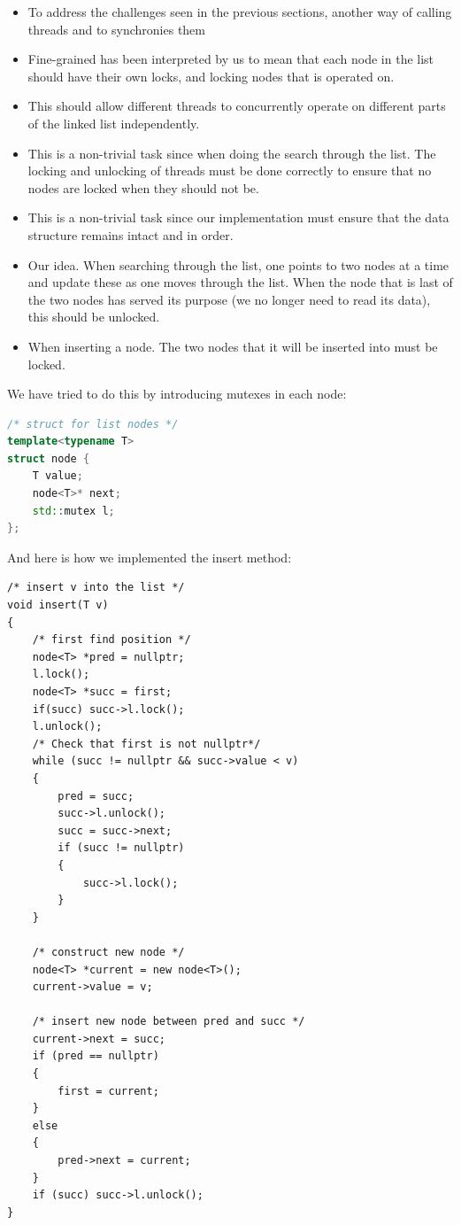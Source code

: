 \begin{itemize}
	\item To address the challenges seen in the previous sections, another way 
	of calling threads and to synchronies them
	\item Fine-grained has been interpreted by us to mean that each node in the 
	list should have their own locks, and locking nodes that is operated on.
	\item This should allow different threads to concurrently operate on different
	parts of the linked list independently.
	\item This is a non-trivial task since when doing the search through the list.
	The locking and unlocking of threads must be done correctly to ensure that no
	nodes are locked when they should not be.
	\item This is a non-trivial task since our implementation must ensure that
	the data structure remains intact and in order. 
	\item Our idea. When searching through the list, one points to two nodes at 
	a time and update these as one moves through the list. When the node that 
	is last of the two nodes has served its purpose (we no longer need to read
	its data), this should be unlocked. 
	\item When inserting a node. The two nodes that it will be inserted into 
	must be locked.
\end{itemize}

We have tried to do this by introducing mutexes in each node:

\begin{lstlisting}[language=C++, caption=Node with lock]
/* struct for list nodes */
template<typename T>
struct node {
	T value;
	node<T>* next;
	std::mutex l;
};
\end{lstlisting}

And here is how we implemented the insert method:

\begin{lstlisting}
/* insert v into the list */
void insert(T v)
{
	/* first find position */
	node<T> *pred = nullptr;
	l.lock();
	node<T> *succ = first;
	if(succ) succ->l.lock();
	l.unlock();
	/* Check that first is not nullptr*/
	while (succ != nullptr && succ->value < v)
	{
		pred = succ;
		succ->l.unlock();
		succ = succ->next;
		if (succ != nullptr)
		{
			succ->l.lock();
		}
	}

	/* construct new node */
	node<T> *current = new node<T>();
	current->value = v;

	/* insert new node between pred and succ */
	current->next = succ;
	if (pred == nullptr)
	{
		first = current;
	}
	else
	{
		pred->next = current;
	}
	if (succ) succ->l.unlock();
}
\end{lstlisting}

